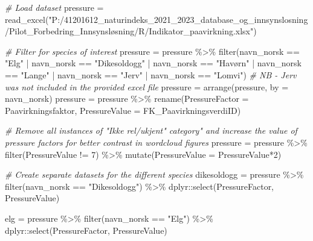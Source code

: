 \documentclass[
]{book}
\newenvironment{Shaded}{\begin{snugshade}}{\end{snugshade}}
\newcommand{\AttributeTok}[1]{\textcolor[rgb]{0.77,0.63,0.00}{#1}}
\newcommand{\CommentTok}[1]{\textcolor[rgb]{0.56,0.35,0.01}{\textit{#1}}}
\newcommand{\DecValTok}[1]{\textcolor[rgb]{0.00,0.00,0.81}{#1}}
\newcommand{\FunctionTok}[1]{\textcolor[rgb]{0.00,0.00,0.00}{#1}}
\newcommand{\NormalTok}[1]{#1}
\newcommand{\OtherTok}[1]{\textcolor[rgb]{0.56,0.35,0.01}{#1}}
\newcommand{\SpecialCharTok}[1]{\textcolor[rgb]{0.00,0.00,0.00}{#1}}
\newcommand{\StringTok}[1]{\textcolor[rgb]{0.31,0.60,0.02}{#1}}
\begin{document}
\begin{Shaded}
\begin{Highlighting}[]

\CommentTok{\# Load dataset}
\NormalTok{pressure }\OtherTok{=} \FunctionTok{read\_excel}\NormalTok{(}\StringTok{"P:/41201612\_naturindeks\_2021\_2023\_database\_og\_innsynslosning/Pilot\_Forbedring\_Innsynsløsning/R/Indikator\_paavirkning.xlsx"}\NormalTok{)}

\CommentTok{\# Filter for species of interest}
\NormalTok{pressure }\OtherTok{=}\NormalTok{ pressure }\SpecialCharTok{\%\textgreater{}\%} \FunctionTok{filter}\NormalTok{(navn\_norsk }\SpecialCharTok{==} \StringTok{"Elg"} \SpecialCharTok{|}\NormalTok{ navn\_norsk }\SpecialCharTok{==} \StringTok{"Dikesoldogg"} \SpecialCharTok{|}\NormalTok{ navn\_norsk }\SpecialCharTok{==} \StringTok{"Havørn"} \SpecialCharTok{|}\NormalTok{ navn\_norsk }\SpecialCharTok{==} \StringTok{"Lange"} \SpecialCharTok{|}\NormalTok{ navn\_norsk }\SpecialCharTok{==} \StringTok{"Jerv"} \SpecialCharTok{|}\NormalTok{ navn\_norsk }\SpecialCharTok{==} \StringTok{"Lomvi"}\NormalTok{) }\CommentTok{\# NB {-} Jerv was not included in the provided excel file}
\NormalTok{pressure }\OtherTok{=} \FunctionTok{arrange}\NormalTok{(pressure, }\AttributeTok{by =}\NormalTok{ navn\_norsk)}
\NormalTok{pressure }\OtherTok{=}\NormalTok{ pressure }\SpecialCharTok{\%\textgreater{}\%} \FunctionTok{rename}\NormalTok{(}\AttributeTok{PressureFactor =}\NormalTok{ Paavirkningsfaktor, }\AttributeTok{PressureValue =}\NormalTok{ FK\_PaavirkningsverdiID)}

\CommentTok{\# Remove all instances of "Ikke rel/ukjent" category" and increase the value of pressure factors for better contrast in wordcloud figures}
\NormalTok{pressure }\OtherTok{=}\NormalTok{ pressure }\SpecialCharTok{\%\textgreater{}\%} \FunctionTok{filter}\NormalTok{(PressureValue }\SpecialCharTok{!=} \DecValTok{7}\NormalTok{) }\SpecialCharTok{\%\textgreater{}\%} \FunctionTok{mutate}\NormalTok{(}\AttributeTok{PressureValue =}\NormalTok{ PressureValue}\SpecialCharTok{*}\DecValTok{2}\NormalTok{) }

\CommentTok{\# Create separate datasets for the different species}
\NormalTok{dikesoldogg }\OtherTok{=}\NormalTok{ pressure }\SpecialCharTok{\%\textgreater{}\%} \FunctionTok{filter}\NormalTok{(navn\_norsk }\SpecialCharTok{==} \StringTok{"Dikesoldogg"}\NormalTok{) }\SpecialCharTok{\%\textgreater{}\%}\NormalTok{ dplyr}\SpecialCharTok{::}\FunctionTok{select}\NormalTok{(PressureFactor, PressureValue)}

\NormalTok{elg }\OtherTok{=}\NormalTok{ pressure }\SpecialCharTok{\%\textgreater{}\%} \FunctionTok{filter}\NormalTok{(navn\_norsk }\SpecialCharTok{==} \StringTok{"Elg"}\NormalTok{) }\SpecialCharTok{\%\textgreater{}\%}\NormalTok{ dplyr}\SpecialCharTok{::}\FunctionTok{select}\NormalTok{(PressureFactor, PressureValue)}


\end{Highlighting}
\end{Shaded}
\end{document}
